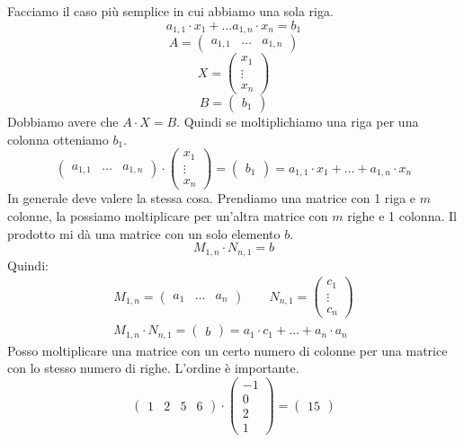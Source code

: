 Facciamo il caso pi\`u semplice in cui abbiamo una sola riga.
\[
a_{1,1} \cdot x_1 + \dots a_{1,n} \cdot x_n = b_1
\]
\[
A = 
\begin{pmatrix}
a_{1,1} & \dots & a_{1,n}
\end{pmatrix}
\]
\[
X = 
\begin{pmatrix}
x_1 \\
\vdots \\
x_n
\end{pmatrix}
\]
\[
B = 
\begin{pmatrix}
b_1
\end{pmatrix}
\]
Dobbiamo avere che $A \cdot X = B$. Quindi se moltiplichiamo una riga per una colonna otteniamo $b_1$.
\[
\begin{pmatrix}
a_{1,1} & \dots & a_{1,n}
\end{pmatrix}
\cdot
\begin{pmatrix}
x_1 \\
\vdots \\
x_n
\end{pmatrix} 
=
\begin{pmatrix}
b_1
\end{pmatrix}
=
a_{1,1} \cdot x_1 + \dots + a_{1,n} \cdot x_n
\]
In generale deve valere la stessa cosa. Prendiamo una matrice con 1 riga e $m$ colonne, la possiamo moltiplicare per un'altra matrice con $m$ righe e 1 colonna. Il prodotto mi d\`a una matrice con un solo elemento $b$.
\[
M_{1, n} \cdot N_{n, 1} = b
\]
Quindi:
\begin{gather*}
M_{1, n} = 
\begin{pmatrix}
a_1 & \dots & a_n
\end{pmatrix}
\qquad
N_{n, 1} = 
\begin{pmatrix}
c_1 \\
\vdots \\
c_n
\end{pmatrix}
\\
M_{1, n} \cdot N_{n, 1} = 
\begin{pmatrix}
b
\end{pmatrix}
= a_1 \cdot c_1 + \ldots + a_n \cdot a_n
\end{gather*}
Posso moltiplicare una matrice con un certo numero di colonne per una matrice con lo stesso numero di righe. L'ordine \`e importante.
\[
\begin{pmatrix}
1 & 2 & 5 & 6 
\end{pmatrix}
\cdot
\begin{pmatrix}
- 1 \\
0 \\
2 \\
1
\end{pmatrix}
=
\begin{pmatrix}
15
\end{pmatrix}
\]

